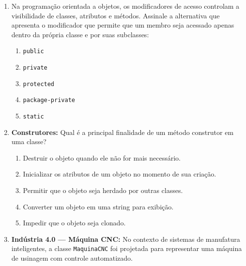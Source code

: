 \documentclass[12pt,a4paper]{article}
\begin{document}
\begin{enumerate}
    \item Na programação orientada a objetos, os modificadores de acesso controlam a visibilidade de classes, atributos e métodos. Assinale a alternativa que apresenta o modificador que permite que um membro seja acessado apenas dentro da própria classe e por suas subclasses:
    \begin{enumerate}[label=\Alph*)]
        \item \texttt{public}
        \item \texttt{private}
        \item \texttt{protected}
        \item \texttt{package-private}
        \item \texttt{static}
    \end{enumerate}

    \item \textbf{Construtores:} Qual é a principal finalidade de um método construtor em uma classe?
    \begin{enumerate}[label=\Alph*)]
        \item Destruir o objeto quando ele não for mais necessário.
        \item Inicializar os atributos de um objeto no momento de sua criação.
        \item Permitir que o objeto seja herdado por outras classes.
        \item Converter um objeto em uma string para exibição.
        \item Impedir que o objeto seja clonado.
    \end{enumerate}


    \vspace{0.3cm}


    \item \textbf{Indústria 4.0 — Máquina CNC:} No contexto de sistemas de manufatura inteligentes, a classe \texttt{MaquinaCNC} foi projetada para representar uma máquina de usinagem com controle automatizado.

    \begin{center}
\end{center}
\end{enumerate}
\end{document}
